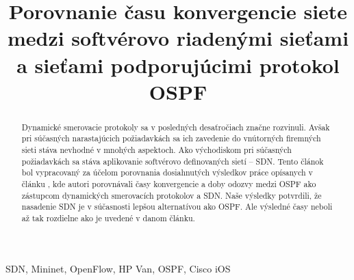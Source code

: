\documentclass[conference]{IEEEtran}
\begin{document}
%
\title{Porovnanie času konvergencie siete medzi softvérovo riadenými sieťami a sieťami podporujúcimi protokol OSPF}

\author{
\and
{}
}




\maketitle

\begin{abstract}
Dynamické smerovacie protokoly sa v posledných desaťročiach značne rozvinuli. Avšak pri súčasných narastajúcich požiadavkách sa ich zavedenie do vnútorných firemných sieti stáva nevhodné v mnohých aspektoch. Ako východiskom pri súčasných požiadavkách sa stáva aplikovanie softvérovo definovaných sietí – SDN. Tento článok bol vypracovaný za účelom porovnania dosiahnutých výsledkov práce opísanych v článku  \cite{article}, kde autori porovnávali časy konvergencie a doby odozvy medzi OSPF ako zástupcom dynamických smerovacích protokolov a SDN. Naše výsledky potvrdili, že nasadenie SDN je v súčasnosti lepšou alternatívou ako OSPF. Ale výsledné časy neboli až tak rozdielne ako je uvedené v danom článku.
\end{abstract}

\begin{IEEEkeywords}
SDN, Mininet, OpenFlow, HP Van, OSPF, Cisco iOS
\end{IEEEkeywords}

\IEEEpeerreviewmaketitle
\end{document}
